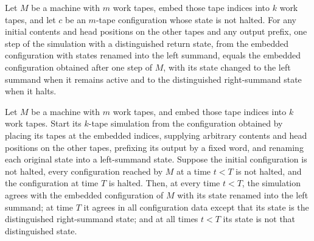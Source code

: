 \begin{lemma}
\label{Turing.embedEmitRet_step}
\leanok
{}
Let $M$ be a machine with $m$ work tapes, embed those tape indices into $k$ work tapes,
and let $c$ be an $m$-tape configuration whose state is not halted. For any initial
contents and head positions on the other tapes and any output prefix, one step of the
simulation with a distinguished return state, from the embedded configuration with
states renamed into the left summand, equals the embedded configuration obtained after
one step of $M$, with its state changed to the left summand when it remains active and
to the distinguished right-summand state when it halts.
\end{lemma}

\begin{theorem}
\label{Turing.embedEmitRetTM_run}
\leanok
{}
Let $M$ be a machine with $m$ work tapes, and embed those tape indices into $k$ work
tapes. Start its $k$-tape simulation from the configuration obtained by placing its
tapes at the embedded indices, supplying arbitrary contents and head positions on the
other tapes, prefixing its output by a fixed word, and renaming each original state into
a left-summand state. Suppose the initial configuration is not halted, every
configuration reached by $M$ at a time $t<T$ is not halted, and the configuration at
time $T$ is halted. Then, at every time $t<T$, the simulation agrees with the embedded
configuration of $M$ with its state renamed into the left summand; at time $T$ it agrees
in all configuration data except that its state is the distinguished right-summand
state; and at all times $t<T$ its state is not that distinguished state.
\end{theorem}

